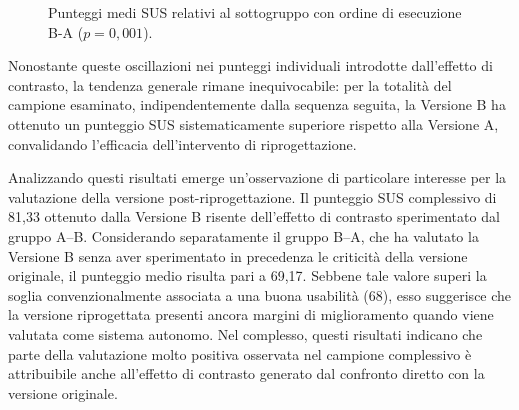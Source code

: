 \begin{figure}[H]
	\centering
	\caption{Punteggi medi SUS relativi al sottogruppo con ordine di esecuzione B-A ($p = 0{,}001$).}
	\label{fig:6-sus-3}
\end{figure}

Nonostante queste oscillazioni nei punteggi individuali introdotte dall'effetto di contrasto, la tendenza generale rimane inequivocabile: per la totalità del campione esaminato, indipendentemente dalla sequenza seguita, la Versione B ha ottenuto un punteggio SUS sistematicamente superiore rispetto alla Versione A, convalidando l'efficacia dell'intervento di riprogettazione.

Analizzando questi risultati emerge un'osservazione di particolare interesse per la valutazione della versione post-riprogettazione. Il punteggio SUS complessivo di 81,33 ottenuto dalla Versione B risente dell'effetto di contrasto sperimentato dal gruppo A–B. Considerando separatamente il gruppo B–A, che ha valutato la Versione B senza aver sperimentato in precedenza le criticità della versione originale, il punteggio medio risulta pari a 69,17. Sebbene tale valore superi la soglia convenzionalmente associata a una buona usabilità (68), esso suggerisce che la versione riprogettata presenti ancora margini di miglioramento quando viene valutata come sistema autonomo. Nel complesso, questi risultati indicano che parte della valutazione molto positiva osservata nel campione complessivo è attribuibile anche all'effetto di contrasto generato dal confronto diretto con la versione originale.
